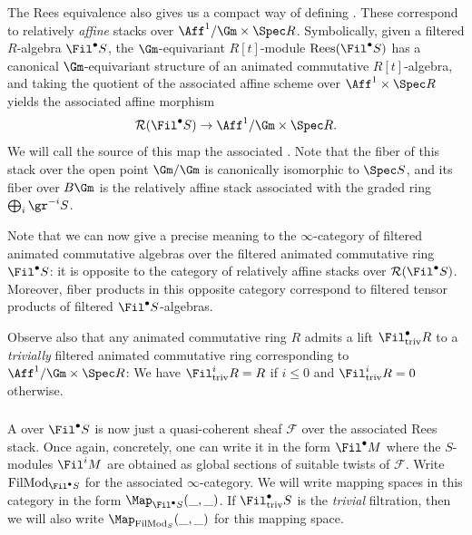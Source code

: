 \documentclass[10pt]{amsart}
\begin{document}
\subsubsection{}
The Rees equivalence also gives us a compact way of defining . These correspond to relatively \emph{affine} stacks over $\Aff^1/\Gm\times \Spec R$. Symbolically, given a filtered $R$-algebra $\Fil^\bullet S$, the $\Gm$-equivariant $R[t]$-module $\mathrm{Rees}(\Fil^\bullet S)$ has a canonical $\Gm$-equivariant structure of an animated commutative $R[t]$-algebra, and taking the quotient of the associated affine scheme over $\Aff^1\times \Spec R$ yields the associated affine morphism
\[
\mathcal{R}(\Fil^\bullet S)\to \Aff^1/\Gm \times \Spec R.
\]
We will call the source of this map the associated . Note that the fiber of this stack over the open point $\Gm/\Gm$ is canonically isomorphic to $\Spec S$, and its fiber over $B\Gm$ is the relatively affine stack associated with the graded ring $\bigoplus_i\gr^{-i}S$. 


Note that we can now give a precise meaning to the $\infty$-category of filtered animated commutative algebras over the filtered animated commutative ring $\Fil^\bullet S$: it is opposite to the category of relatively affine stacks over $\mathcal{R}(\Fil^\bullet S)$. Moreover, fiber products in this opposite category correspond to filtered tensor products of filtered $\Fil^\bullet S$-algebras.

Observe also that any animated commutative ring $R$ admits a lift $\Fil^\bullet_{\mathrm{triv}}R$ to a \emph{trivially} filtered animated commutative ring corresponding to $\Aff^1/\Gm\times\Spec R$: We have $\Fil^i_{\mathrm{triv}}R = R$ if $i\leq 0$ and $\Fil^i_{\mathrm{triv}}R = 0$ otherwise.


\subsubsection{}
A  over $\Fil^\bullet S$ is now just a quasi-coherent sheaf $\mathcal{F}$ over the associated Rees stack. Once again, concretely, one can write it in the form $\Fil^\bullet M$ where the $S$-modules $\Fil^iM$ are obtained as global sections of suitable twists of $\mathcal{F}$. Write $\mathrm{FilMod}_{\Fil^\bullet S}$ for the associated $\infty$-category. We will write mapping spaces in this category in the form $\Map_{\Fil^\bullet S}(\_,\_)$. If $\Fil^\bullet_{\mathrm{triv}}S$ is the \emph{trivial} filtration, then we will also write $\Map_{\mathrm{FilMod}_S}(\_,\_)$ for this mapping space.
\end{document}
